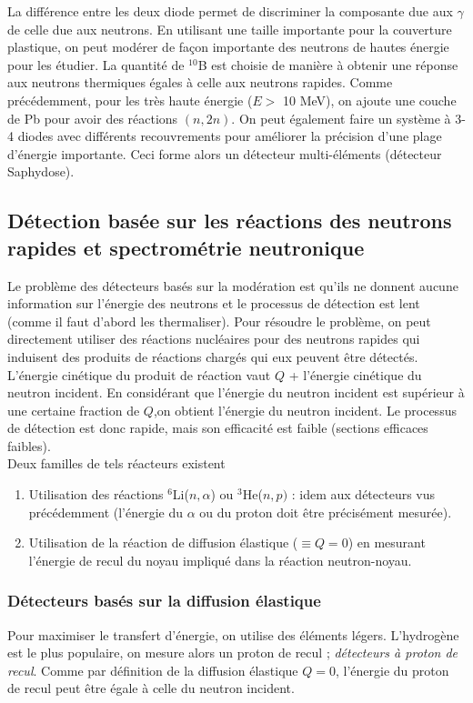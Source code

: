 La différence entre les deux diode permet de discriminer la composante due aux $\gamma$ de celle
due aux neutrons. En utilisant une taille importante pour la couverture plastique, on peut 
modérer de façon importante des neutrons de hautes énergie pour les étudier. La quantité de $^{10}$B
est choisie de manière à obtenir une réponse aux neutrons thermiques égales à celle aux neutrons
rapides. Comme précédemment, pour les très haute énergie ($E >$ 10 MeV), on ajoute une couche
de Pb pour avoir des réactions $(n,2n)$. On peut également faire un système à 3-4 diodes avec
différents recouvrements pour améliorer la précision d'une plage d'énergie importante. Ceci forme
alors un détecteur multi-éléments (détecteur Saphydose).


\subsection{Détection basée sur les réactions des neutrons rapides et spectrométrie neutronique}%
Le problème des détecteurs basés sur la modération est qu'ils ne donnent aucune information sur 
l'énergie des neutrons et le processus de détection est lent (comme il faut d'abord les 
thermaliser). Pour résoudre le problème, on peut directement utiliser des réactions nucléaires pour
des neutrons rapides qui induisent des produits de réactions chargés qui eux peuvent être détectés. \\

L'énergie cinétique du produit de réaction vaut $Q$ + l'énergie cinétique du neutron incident. En
considérant que l'énergie du neutron incident est supérieur à une certaine fraction de $Q$,on obtient
l'énergie du neutron incident. Le processus de détection est donc rapide, mais son efficacité est
faible (sections efficaces faibles).\\

Deux familles de tels réacteurs existent
\begin{enumerate}
\item Utilisation des réactions $^6$Li($n,\alpha$) ou $^3$He($n,p)$ : idem aux détecteurs vus 
précédemment (l'énergie du $\alpha$ ou du proton doit être précisément mesurée).
\item Utilisation de la réaction de diffusion élastique ($\equiv Q=0$) en mesurant l'énergie de recul
du noyau impliqué dans la réaction neutron-noyau.
\end{enumerate}

\subsubsection{Détecteurs basés sur la diffusion élastique}
Pour maximiser le transfert d'énergie, on utilise des éléments légers. L'hydrogène est le plus 
populaire, on mesure alors un proton de recul ; \textit{détecteurs à proton de recul}. Comme par
 définition de la diffusion élastique $Q=0$, l'énergie du proton de recul peut être égale à celle
 du neutron incident.

